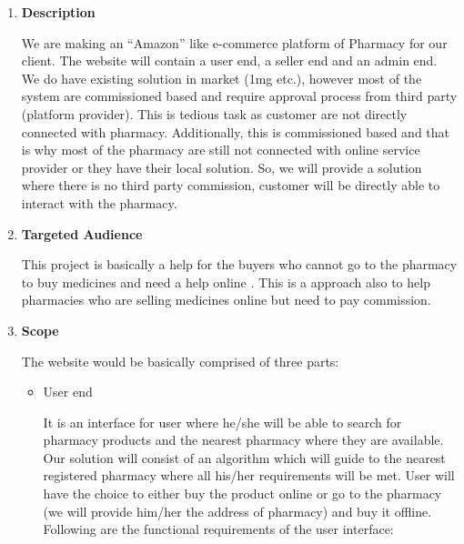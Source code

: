 \documentclass[fleqn,10pt]{../SelfArx} %
\begin{document}
\vspace{0.5cm}
\begin{enumerate}
\item \textbf{ Description}

We are making an “Amazon” like e-commerce platform of Pharmacy for our
client. The website will contain a user end, a seller end and an admin end. We
do have existing solution in market (1mg etc.), however most of the system are
commissioned based and require approval process from third party (platform
provider). This is tedious task as customer are not directly connected with
pharmacy. Additionally, this is commissioned based and that is why most of
the pharmacy are still not connected with online service provider or they have
their local solution. So, we will provide a solution where there is no third party
commission, customer will be directly able to interact with the pharmacy.
\item \textbf{Targeted Audience}

This project is basically a help for the buyers who cannot go to the pharmacy to buy medicines and need a help online . This is a approach also to help pharmacies who are selling medicines online but need to pay commission.

\item \textbf{Scope}

The website would be basically comprised of three parts:
\begin{itemize}
    \item User end
   
It is an interface for user where he/she will be able to search for pharmacy products and the nearest pharmacy where they are available. Our solution will consist of an algorithm which will guide to the nearest registered pharmacy where all his/her requirements will be met. User will have the choice to either buy the product online or go to the pharmacy (we will provide him/her the address of pharmacy) and buy it offline. Following are the functional requirements of the user interface:


\end{itemize}
\end{enumerate}
\end{document}
